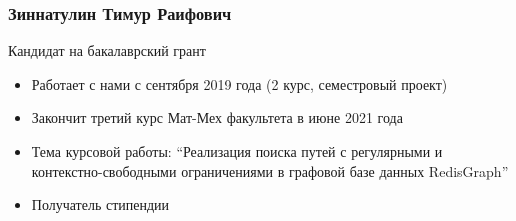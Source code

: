 \documentclass[xcolor=table,aspectratio=169]{beamer}
\begin{document}
\begin{frame}[fragile] \frametitle{Зиннатулин Тимур Раифович}
      \begin{minipage}[m]{0.45\linewidth}
  \end{minipage}\hfill
  \begin{minipage}[m]{0.54\linewidth}
  \vspace{-2cm}
  Кандидат на бакалаврский грант

  \begin{itemize}
        \item Работает с нами с сентября 2019 года (2 курс, семестровый проект)
        \item Закончит третий курс Мат-Мех факультета в июне 2021 года
        \item Тема курсовой работы: ``Реализация поиска путей с регулярными и контекстно-свободными ограничениями в графовой базе данных RedisGraph''
        \item Получатель стипендии        
  \end{itemize}
  \end{minipage}

\end{frame}
\end{document}
